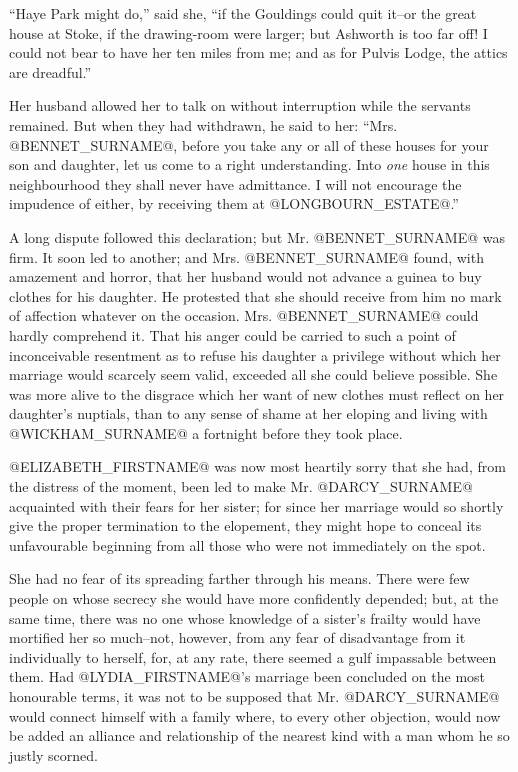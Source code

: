 ``Haye Park might do,'' said she, ``if the Gouldings could quit it--or the
great house at Stoke, if the drawing-room were larger; but Ashworth is
too far off! I could not bear to have her ten miles from me; and as for
Pulvis Lodge, the attics are dreadful.''

Her husband allowed her to talk on without interruption while the
servants remained. But when they had withdrawn, he said to her: ``Mrs.
@BENNET_SURNAME@, before you take any or all of these houses for your son and
daughter, let us come to a right understanding. Into \textit{one} house in this
neighbourhood they shall never have admittance. I will not encourage the
impudence of either, by receiving them at @LONGBOURN_ESTATE@.''

A long dispute followed this declaration; but Mr. @BENNET_SURNAME@ was firm. It
soon led to another; and Mrs. @BENNET_SURNAME@ found, with amazement and horror,
that her husband would not advance a guinea to buy clothes for his
daughter. He protested that she should receive from him no mark of
affection whatever on the occasion. Mrs. @BENNET_SURNAME@ could hardly comprehend
it. That his anger could be carried to such a point of inconceivable
resentment as to refuse his daughter a privilege without which her
marriage would scarcely seem valid, exceeded all she could believe
possible. She was more alive to the disgrace which her want of new
clothes must reflect on her daughter's nuptials, than to any sense of
shame at her eloping and living with @WICKHAM_SURNAME@ a fortnight before they
took place.

@ELIZABETH_FIRSTNAME@ was now most heartily sorry that she had, from the distress of
the moment, been led to make Mr. @DARCY_SURNAME@ acquainted with their fears for
her sister; for since her marriage would so shortly give the
proper termination to the elopement, they might hope to conceal its
unfavourable beginning from all those who were not immediately on the
spot.

She had no fear of its spreading farther through his means. There were
few people on whose secrecy she would have more confidently depended;
but, at the same time, there was no one whose knowledge of a sister's
frailty would have mortified her so much--not, however, from any fear
of disadvantage from it individually to herself, for, at any rate,
there seemed a gulf impassable between them. Had @LYDIA_FIRSTNAME@'s marriage been
concluded on the most honourable terms, it was not to be supposed that
Mr. @DARCY_SURNAME@ would connect himself with a family where, to every other
objection, would now be added an alliance and relationship of the
nearest kind with a man whom he so justly scorned.

